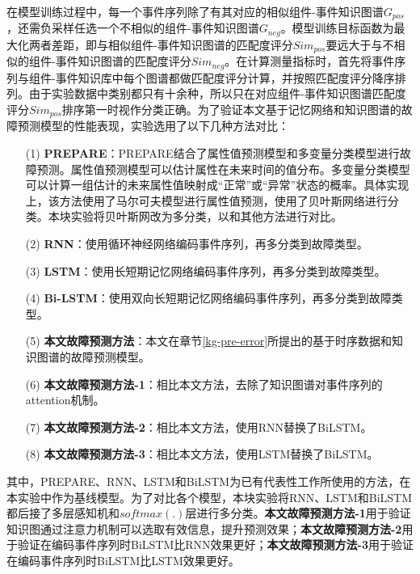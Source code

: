 在模型训练过程中，每一个事件序列除了有其对应的相似组件-事件知识图谱$G_{pos}$，还需负采样任选一个不相似的组件-事件知识图谱$G_{neg}$。模型训练目标函数为最大化两者差距，即与相似组件-事件知识图谱的匹配度评分$Sim_{pos}$要远大于与不相似的组件-事件知识图谱的匹配度评分$Sim_{neg}$。在计算测量指标时，首先将事件序列与组件-事件知识库中每个图谱都做匹配度评分计算，并按照匹配度评分降序排列。由于实验数据中类别都只有十余种，所以只在对应组件-事件知识图谱匹配度评分$Sim_{pos}$排序第一时视作分类正确。为了验证本文基于记忆网络和知识图谱的故障预测模型的性能表现，实验选用了以下几种方法对比：
\begin{itemize}
    \item [(1)] 
    \textbf{PREPARE}\cite{tan2012prepare}：PREPARE结合了属性值预测模型和多变量分类模型进行故障预测。属性值预测模型可以估计属性在未来时间的值分布。多变量分类模型可以计算一组估计的未来属性值映射成“正常”或“异常”状态的概率。具体实现上，该方法使用了马尔可夫模型进行属性值预测，使用了贝叶斯网络进行分类。本块实验将贝叶斯网改为多分类，以和其他方法进行对比。
    \item [(2)]
    \textbf{RNN}\cite{xu2016health}：使用循环神经网络编码事件序列，再多分类到故障类型。
    \item [(3)]
    \textbf{LSTM}\cite{cheng2018machine,du2017deeplog,das2018desh,islam2017predicting,li2020predicting}：使用长短期记忆网络编码事件序列，再多分类到故障类型。
    \item [(4)]
    \textbf{Bi-LSTM}\cite{gao2020task}：使用双向长短期记忆网络编码事件序列，再多分类到故障类型。
    \item [(5)]
    \textbf{本文故障预测方法}：本文在章节\ref{kg-pre-error}所提出的基于时序数据和知识图谱的故障预测模型。
    \item [(6)]
    \textbf{本文故障预测方法-1}：相比本文方法，去除了知识图谱对事件序列的attention机制。
    \item [(7)]
    \textbf{本文故障预测方法-2}：相比本文方法，使用RNN替换了BiLSTM。
    \item [(8)]
    \textbf{本文故障预测方法-3}：相比本文方法，使用LSTM替换了BiLSTM。

\end{itemize}

其中，PREPARE、RNN、LSTM和BiLSTM为已有代表性工作所使用的方法，在本实验中作为基线模型。为了对比各个模型，本块实验将RNN、LSTM和BiLSTM都后接了多层感知机和$softmax(.)$层进行多分类。\textbf{本文故障预测方法-1}用于验证知识图通过注意力机制可以选取有效信息，提升预测效果；\textbf{本文故障预测方法-2}用于验证在编码事件序列时BiLSTM比RNN效果更好；\textbf{本文故障预测方法-3}用于验证在编码事件序列时BiLSTM比LSTM效果更好。

